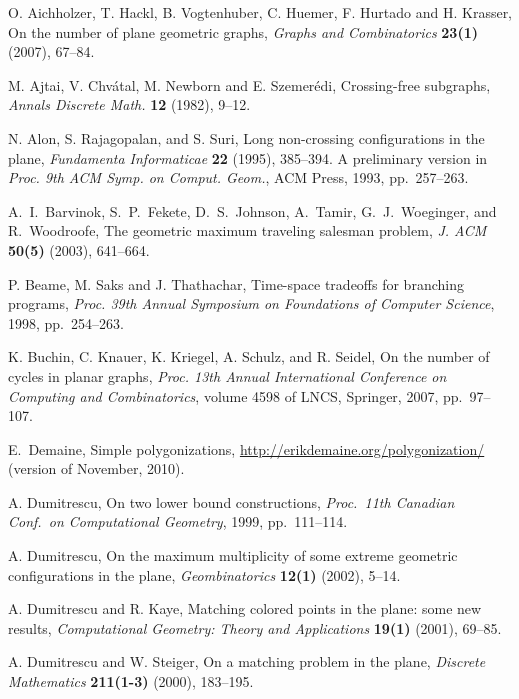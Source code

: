 \documentclass[11pt]{article}
\begin{document}
\begin{thebibliography}{99}

 O. Aichholzer, T. Hackl, B. Vogtenhuber, C. Huemer,
F. Hurtado and H. Krasser,
On the number of plane geometric graphs,
\emph{Graphs and Combinatorics} {\bf 23(1)} (2007), 67--84.

 M. Ajtai, V. Chv\'atal, M. Newborn and E. Szemer\'edi,
Crossing-free subgraphs,
\emph{Annals Discrete Math.} {\bf 12} (1982), 9--12.

 N. Alon, S. Rajagopalan, and S. Suri,
Long non-crossing configurations in the plane,
{\em Fundamenta Informaticae} {\bf 22} (1995), 385--394.
A preliminary version in \emph{Proc. 9th ACM Symp. on Comput. Geom.},
ACM Press, 1993, pp.~257--263.



A.~I.~Barvinok, S.~P.~Fekete, D.~S.~Johnson, A.~Tamir,
G.~J.~Woeginger, and R.~Woodroofe,
The geometric maximum traveling salesman problem,
\emph{J. ACM} {\bf 50(5)} (2003), 641--664.

 P. Beame, M. Saks and J. Thathachar,
Time-space tradeoffs for branching programs,
{\it Proc. 39th Annual Symposium on Foundations of Computer Science},
1998, pp.~254--263.


K. Buchin, C. Knauer, K. Kriegel, A. Schulz, and R. Seidel,
On the number of cycles in planar graphs,
\emph{Proc. 13th Annual International Conference on
  Computing and Combinatorics},
  volume 4598 of LNCS, Springer, 2007, pp.~97--107.


E.\ Demaine, Simple polygonizations,
\url{http://erikdemaine.org/polygonization/} (version of November, 2010).



 A. Dumitrescu,
On two lower bound constructions,
\emph{Proc.\ 11th Canadian Conf.\ on Computational Geometry}, 
1999, pp.~111--114.

 A. Dumitrescu,
On the maximum multiplicity of some extreme geometric configurations in the plane,
{\em Geombinatorics} {\bf 12(1)} (2002), 5--14.

 A. Dumitrescu and R. Kaye,
Matching colored points in the plane: some new results,
{\em Computational Geometry: Theory and Applications}
{\bf 19(1)} (2001), 69--85.

 A. Dumitrescu and W. Steiger,
On a matching problem in the plane,
{\em Discrete Mathematics} {\bf 211(1-3)} (2000), 183--195.


\end{thebibliography}
\end{document}
